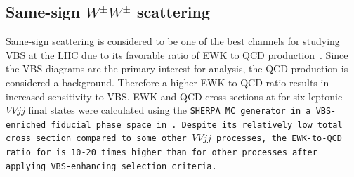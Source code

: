 \subsection{Same-sign $W^{\pm}W^{\pm}$ scattering}\label{ssww13tev:ssww_topology}
Same-sign \ssww scattering is considered to be one of the best channels for studying VBS at the LHC due to its favorable ratio of EWK to QCD production~\cite{2015.higgs-constraints-from-vbs}.
Since the VBS diagrams are the primary interest for analysis, the QCD production is considered a background.
Therefore a higher EWK-to-QCD ratio results in increased sensitivity to VBS.
EWK and QCD cross sections at  for six leptonic $VVjj$ final states were calculated using the \tt{SHERPA} MC generator in a VBS-enriched fiducial phase space in~\cite{2014.ssww-thesis-gumpert}.
Despite its relatively low total cross section compared to some other $VVjj$ processes, the EWK-to-QCD ratio for \ssww is 10-20 times higher than for other processes after applying VBS-enhancing selection criteria.


